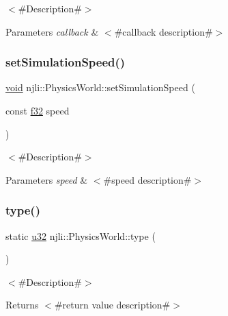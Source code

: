 $<$\#\+Description\#$>$


\begin{DoxyParams}{Parameters}
{\em callback} & $<$\#callback description\#$>$ \\
\hline
\end{DoxyParams}
\mbox{\label{classnjli_1_1_physics_world_a6349b4cedb5718009109d9614e8cc8b7}} 
\subsubsection{\texorpdfstring{set\+Simulation\+Speed()}{setSimulationSpeed()}}
{\footnotesize\ttfamily \mbox{\hyperlink{_thread_8h_af1e856da2e658414cb2456cb6f7ebc66}{void}} njli\+::\+Physics\+World\+::set\+Simulation\+Speed (\begin{DoxyParamCaption}\item[{const \mbox{\hyperlink{_util_8h_a5f6906312a689f27d70e9d086649d3fd}{f32}}}]{speed }\end{DoxyParamCaption})}

$<$\#\+Description\#$>$


\begin{DoxyParams}{Parameters}
{\em speed} & $<$\#speed description\#$>$ \\
\hline
\end{DoxyParams}
\mbox{\label{classnjli_1_1_physics_world_adfed64f0c077cb328745d8ad18a5e217}} 
\subsubsection{\texorpdfstring{type()}{type()}}
{\footnotesize\ttfamily static \mbox{\hyperlink{_util_8h_a10e94b422ef0c20dcdec20d31a1f5049}{u32}} njli\+::\+Physics\+World\+::type (\begin{DoxyParamCaption}{ }\end{DoxyParamCaption})\hspace{0.3cm}{\ttfamily [static]}}

$<$\#\+Description\#$>$

\begin{DoxyReturn}{Returns}
$<$\#return value description\#$>$ 
\end{DoxyReturn}
\mbox{\label{classnjli_1_1_physics_world_a2d13fac3772ac6a2417cbdfb9ec65ed2}} 
